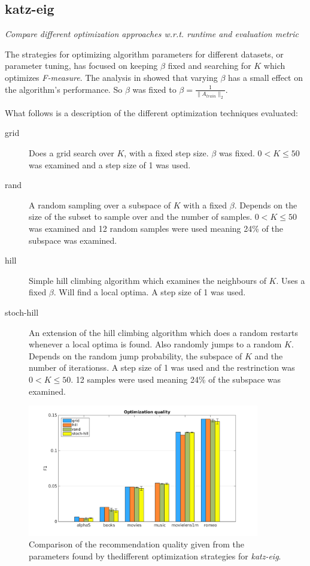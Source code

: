 
\subsection{katz-eig}

\textit{Compare different optimization approaches w.r.t. runtime and evaluation metric}

The strategies for optimizing algorithm parameters for different datasets, or parameter tuning, has focused on keeping $\beta$ fixed and searching for $K$ which optimizes \textit{F-measure}. The analysis in  showed that varying $\beta$ has a small effect on the algorithm's performance. So $\beta$ was fixed to $\beta = \frac{1}{\|A_{train}\|_2}$.

What follows is a description of the different optimization techniques evaluated:

\begin{description}
    \item[grid]
        Does a grid search over $K$, with a fixed step size. $\beta$ was fixed. $0 < K \leq 50$ was examined and a step size of 1 was used.
    \item[rand]
        A random sampling over a subspace of $K$ with a fixed $\beta$. Depends on the size of the subset to sample over and the number of samples. $0 < K \leq 50$ was examined and 12 random samples were used meaning 24\% of the subspace was examined.
    \item[hill]
        Simple hill climbing algorithm which examines the neighbours of $K$. Uses a fixed $\beta$. Will find a local optima. A step size of 1 was used.
    \item[stoch-hill]
        An extension of the hill climbing algorithm which does a random restarts whenever a local optima is found. Also randomly jumps to a random $K$. Depends on the random jump probability, the subspace of $K$ and the number of iterationss. A step size of 1 was used and the restrinction was $0 < K \leq 50$. 12 samples were used meaning 24\% of the subspace was examined.
\end{description}

\begin{figure}[h!]
    \centering
    \includegraphics[width=0.9\textwidth]{fig/comp/comp_katz_quality.png}
    \caption{Comparison of the recommendation quality given from the parameters found by thedifferent optimization strategies for \textit{katz-eig}.}
\end{figure}

